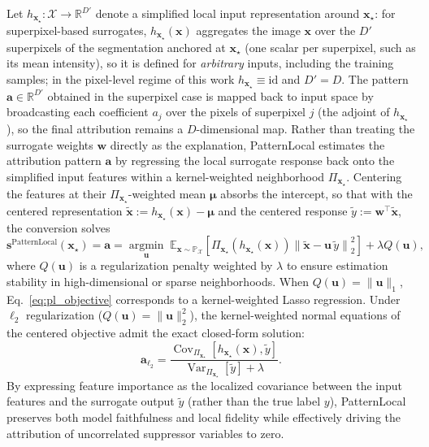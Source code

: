 \documentclass[pdflatex,sn-mathphys-num]{sn-jnl}
\theoremstyle{thmstyleone}
\theoremstyle{thmstyletwo}%
\theoremstyle{thmstylethree}%
\begin{document}
Let $h_{\mathbf{x}_\star}: \mathcal{X} \to \mathbb{R}^{D'}$ denote a simplified local input representation around $\mathbf{x}_\star$: for superpixel-based surrogates, $h_{\mathbf{x}_\star}(\mathbf{x})$ aggregates the image $\mathbf{x}$ over the $D'$ superpixels of the segmentation anchored at $\mathbf{x}_\star$ (one scalar per superpixel, such as its mean intensity), so it is defined for \emph{arbitrary} inputs, including the training samples; in the pixel-level regime of this work $h_{\mathbf{x}_\star} \equiv \mathrm{id}$ and $D' = D$. The pattern $\mathbf{a} \in \mathbb{R}^{D'}$ obtained in the superpixel case is mapped back to input space by broadcasting each coefficient $a_j$ over the pixels of superpixel $j$ (the adjoint of $h_{\mathbf{x}_\star}$), so the final attribution remains a $D$-dimensional map. Rather than treating the surrogate weights $\mathbf{w}$ directly as the explanation, PatternLocal estimates the attribution pattern $\mathbf{a}$ by regressing the local surrogate response back onto the simplified input features within a kernel-weighted neighborhood $\Pi_{\mathbf{x}_\star}$. Centering the features at their $\Pi_{\mathbf{x}_\star}$-weighted mean $\boldsymbol{\mu}$ absorbs the intercept, so that with the centered representation $\tilde{\mathbf{x}} \mathrel{:=} h_{\mathbf{x}_\star}(\mathbf{x}) - \boldsymbol{\mu}$ and the centered response $\tilde{y} \mathrel{:=} \mathbf{w}^\top \tilde{\mathbf{x}}$, the conversion solves
\begin{equation}
    \mathbf{s}^{\text{PatternLocal}}(\mathbf{x}_\star) = \mathbf{a} = \operatorname*{argmin}_{\mathbf{u}} \; \mathbb{E}_{\mathbf{x} \sim \mathbb{P}_{\mathcal{X}}} \left[ \Pi_{\mathbf{x}_\star}(h_{\mathbf{x}_\star}(\mathbf{x})) \left\| \tilde{\mathbf{x}} - \mathbf{u}\,\tilde{y} \right\|_2^2 \right] + \lambda Q(\mathbf{u}),
    \label{eq:pl_objective}
\end{equation}
where $Q(\mathbf{u})$ is a regularization penalty weighted by $\lambda$ to ensure estimation stability in high-dimensional or sparse neighborhoods. When $Q(\mathbf{u}) = \|\mathbf{u}\|_1$, Eq.~\eqref{eq:pl_objective} corresponds to a kernel-weighted Lasso regression. Under $\ell_2$ regularization ($Q(\mathbf{u}) = \|\mathbf{u}\|_2^2$), the kernel-weighted normal equations of the centered objective admit the exact closed-form solution:
\begin{equation}
    \mathbf{a}_{\ell_2} = \frac{\operatorname{Cov}_{\Pi_{\mathbf{x}_\star}}[h_{\mathbf{x}_\star}(\mathbf{x}), \tilde{y}]}{\operatorname{Var}_{\Pi_{\mathbf{x}_\star}}[\tilde{y}] + \lambda}.
    \label{eq:pl_closed}
\end{equation}
By expressing feature importance as the localized covariance between the input features and the surrogate output $\tilde{y}$ (rather than the true label $y$), PatternLocal preserves both model faithfulness and local fidelity while effectively driving the attribution of uncorrelated suppressor variables to zero.
\end{document}
